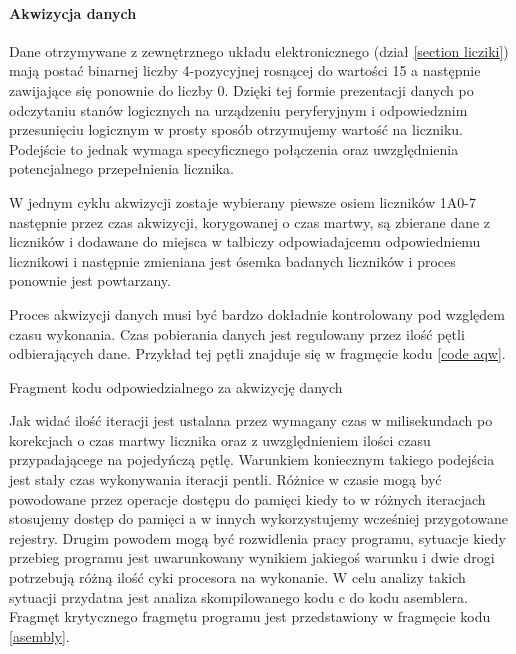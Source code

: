 \documentclass[a4paper,12pt]{article}
\begin{document}
\paragraph{Akwizycja danych}
Dane otrzymywane z zewnętrznego układu elektronicznego (dział \ref{section licziki}) mają postać binarnej liczby 4-pozycyjnej rosnącej do wartości 15 a następnie zawijające się ponownie do liczby 0. 
Dzięki tej formie prezentacji danych po odczytaniu stanów logicznych na urządzeniu peryferyjnym i odpowiedznim przesunięciu logicznym w prosty sposób otrzymujemy wartość na liczniku. 
Podejście to jednak wymaga specyficznego połączenia oraz uwzględnienia potencjalnego przepełnienia licznika. 

W jednym cyklu akwizycji zostaje wybierany piewsze osiem liczników 1A0-7 następnie przez czas akwizycji, korygowanej o czas martwy, są zbierane dane z liczników i dodawane do miejsca w talbiczy odpowiadajcemu odpowiedniemu licznikowi i następnie zmieniana jest ósemka badanych liczników i proces ponownie jest powtarzany. 

Proces akwizycji danych musi być bardzo dokładnie kontrolowany pod względem czasu wykonania.
Czas pobierania danych jest regulowany przez ilość pętli odbierających dane.
Przykład tej pętli znajduje się w fragmęcie kodu \ref{code aqw}.

\begin{kod}
        
        \caption{Fragment kodu odpowiedzialnego za akwizycję danych}
        \label{code aqw}
\end{kod}

Jak widać ilość iteracji jest ustalana przez wymagany czas w milisekundach po korekcjach o czas martwy licznika oraz z uwzględnieniem ilości czasu przypadającege na pojedyńczą pętlę. 
Warunkiem koniecznym takiego podejścia jest stały czas wykonywania iteracji pentli. 
Różnice w czasie mogą być powodowane przez operacje dostępu do pamięci kiedy to w różnych iteracjach stosujemy dostęp do pamięci a w innych wykorzystujemy wcześniej przygotowane rejestry.
Drugim powodem mogą być rozwidlenia pracy programu, sytuacje kiedy przebieg programu jest uwarunkowany wynikiem jakiegoś warunku i dwie drogi potrzebują różną ilość cyki procesora na wykonanie. 
W celu analizy takich sytuacji przydatna jest analiza skompilowanego kodu c do kodu asemblera.
Fragmęt krytycznego fragmętu programu jest przedstawiony w fragmęcie kodu \ref{asembly}.

\begin{kod}
        Assembler},firstline=30, lastline=48]{code_source/asembler/loop_final.S}
        \caption{Fragment kodu asemblera utworzonego przez kompilację części kodu \ref{code aqw}. }
        \label{asembly}
\end{kod}
\end{document}

